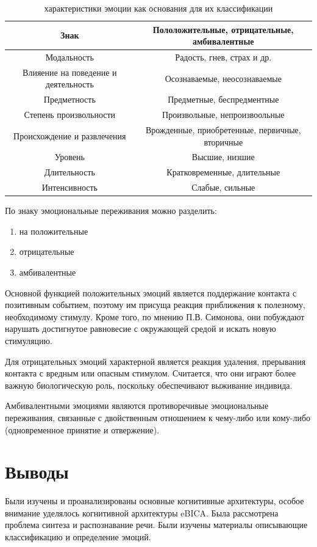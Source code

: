 \begin{table}[H]
\caption{характеристики эмоции как основания для их классификации}
\label{tbl:text_a00}
\begin{center}

\begin{tabular}{ | c | c | }
	\hline
	Знак & Пололожительные, отрицательные, амбивалентные \\ \hline 
	Модальность & Радость, гнев, страх и др. \\ \hline
	Влияение на поведение и деятельность & Осознаваемые, неосознаваемые \\ \hline
	Предметность	& Предметные, беспредментные \\ \hline
	Степень произвольности & Произвольные, непроизвоольные \\ \hline
	Происхождение и развлечения & Врожденные, приобретенные, первичные, вторичные \\ \hline
	Уровень & Высшие, низшие \\ \hline
	Длительность & Кратковременные, длительные \\ \hline
	Интенсивность & Слабые, сильные \\ \hline
\end{tabular}
\end{center}
\end{table}

По знаку эмоциональные переживания можно разделить:
\begin{enumerate}
	\item на положительные
	\item отрицательные
	\item амбивалентные
\end{enumerate}

Основной функцией положительных эмоций является поддержание контакта с позитивным событием, поэтому им присуща реакция приближения к полезному, 
необходимому стимулу. Кроме того, по мнению П.В. Симонова, они побуждают нарушать достигнутое равновесие с окружающей средой и искать новую стимуляцию.

Для отрицательных эмоций характерной является реакция удаления, прерывания контакта с вредным или опасным стимулом.
Считается, что они играют более важную биологическую роль, поскольку обеспечивают выживание индивида.

Амбивалентными эмоциями являются противоречивые эмоциональные переживания, связанные с двойственным отношением к чему-либо или кому-либо (одновременное принятие и отвержение).

\section{Выводы}

Были изучены и проанализированы основные когнитивные архитектуры, особое внимание уделялось когнитивной архитектуры eBICA.
Была рассмотрена проблема синтеза и распознавание речи. Были изучены материалы описывающие классификацию и определение эмоций.

